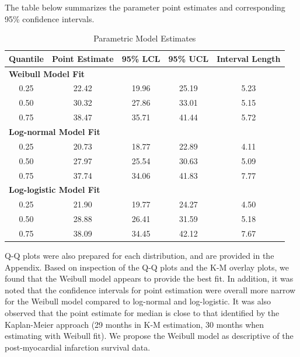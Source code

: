 \documentclass[
]{article}
\begin{document}
\newpage

The table below summarizes the parameter point estimates and
corresponding 95\% confidence intervals.

\begin{table}[H]

\caption{\label{tab:unnamed-chunk-2}Parametric Model Estimates}
\centering
\begin{tabular}[t]{c|c|c|c|c}
\hline
Quantile & Point Estimate & 95\% LCL & 95\% UCL & Interval Length\\
\hline
\multicolumn{5}{l}{\textbf{Weibull Model Fit}}\\
\hline
\hspace{1em}0.25 & 22.42 & 19.96 & 25.19 & 5.23\\
\hline
\hspace{1em}0.50 & 30.32 & 27.86 & 33.01 & 5.15\\
\hline
\hspace{1em}0.75 & 38.47 & 35.71 & 41.44 & 5.72\\
\hline
\multicolumn{5}{l}{\textbf{Log-normal Model Fit}}\\
\hline
\hspace{1em}0.25 & 20.73 & 18.77 & 22.89 & 4.11\\
\hline
\hspace{1em}0.50 & 27.97 & 25.54 & 30.63 & 5.09\\
\hline
\hspace{1em}0.75 & 37.74 & 34.06 & 41.83 & 7.77\\
\hline
\multicolumn{5}{l}{\textbf{Log-logistic Model Fit}}\\
\hline
\hspace{1em}0.25 & 21.90 & 19.77 & 24.27 & 4.50\\
\hline
\hspace{1em}0.50 & 28.88 & 26.41 & 31.59 & 5.18\\
\hline
\hspace{1em}0.75 & 38.09 & 34.45 & 42.12 & 7.67\\
\hline
\end{tabular}
\end{table}

Q-Q plots were also prepared for each distribution, and are provided in
the Appendix. Based on inspection of the Q-Q plots and the K-M overlay
plots, we found that the Weibull model appears to provide the best fit.
In addition, it was noted that the confidence intervals for point
estimation were overall more narrow for the Weibull model compared to
log-normal and log-logistic. It was also observed that the point
estimate for median is close to that identified by the Kaplan-Meier
approach (29 months in K-M estimation, 30 months when estimating with
Weibull fit). We propose the Weibull model as descriptive of the
post-myocardial infarction survival data.
\end{document}
